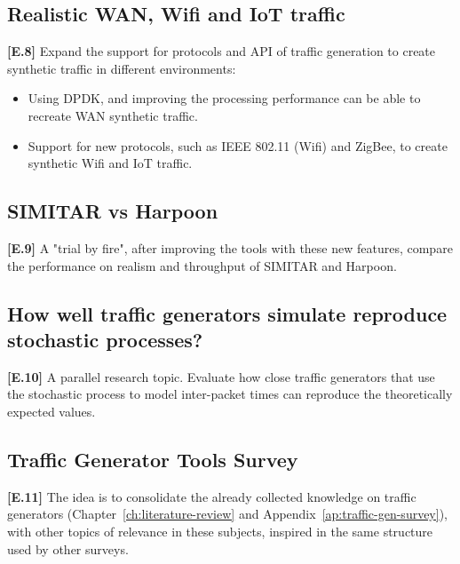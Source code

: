 \subsection{Realistic WAN, Wifi and IoT traffic}

\textbf{[E.8]} Expand the support for protocols and API of traffic generation to create synthetic traffic in different environments:
\begin{itemize}
\item Using DPDK, and improving the processing performance can be able to recreate WAN synthetic traffic. 
\item Support for new protocols, such as IEEE 802.11 (Wifi) and ZigBee, to create synthetic Wifi and IoT traffic.
\end{itemize}

\subsection{SIMITAR vs Harpoon}

\textbf{[E.9]} A "trial by fire", after improving the tools with these new features, compare the performance on realism and throughput of SIMITAR and Harpoon.

\subsection{How well traffic generators simulate reproduce stochastic processes?}

\textbf{[E.10]} A parallel research topic. Evaluate how close traffic generators that use the stochastic process to model inter-packet times can reproduce the theoretically expected values. 

\subsection{Traffic Generator Tools Survey}

\textbf{[E.11]} The idea is to consolidate the already collected knowledge on traffic generators (Chapter~\ref{ch:literature-review} and Appendix~\ref{ap:traffic-gen-survey}), with other topics of relevance in these subjects, inspired in the same structure used by other surveys.